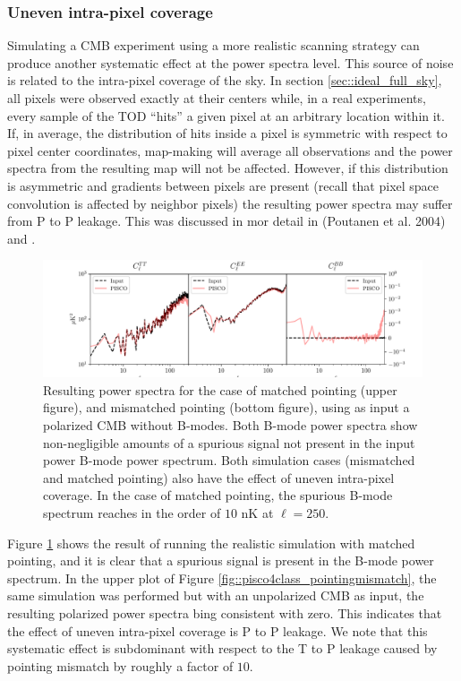\documentclass[a4paper,11pt]{article}
\begin{document}
\subsubsection{Uneven intra-pixel coverage}

Simulating a CMB experiment using a more realistic scanning strategy can produce another systematic effect at the power spectra level. This source of noise is related to the intra-pixel coverage of the sky. In section \ref{sec::ideal_full_sky}, all pixels were observed exactly at their centers while, in a real experiments, every sample of the TOD ``hits'' a given pixel at an arbitrary location within it. If, in average, the distribution of hits inside a pixel is symmetric with respect to pixel center coordinates, map-making will average all observations and the power spectra from the resulting map will not be affected. However, if this distribution is asymmetric and gradients between pixels are present (recall that pixel space convolution is affected by neighbor pixels) the resulting power spectra may suffer from P to P leakage. This was discussed in mor detail in (Poutanen et al. 2004) and \cite{2005poutanen}. 

\begin{figure}
	\centering
	\includegraphics[width=1\textwidth]{figures/cmb_r0d00_CLASS_matchedPointing_matchedBeams_ellipticalBeams.pdf}
	\caption{Resulting power spectra for the case of matched pointing (upper figure), and mismatched pointing (bottom figure), using as input a polarized CMB without B-modes. Both B-mode power spectra show non-negligible amounts of a spurious signal not present in the input power B-mode power spectrum. Both simulation cases (mismatched and matched pointing) also have the effect of uneven intra-pixel coverage. In the case of matched pointing, the spurious B-mode spectrum reaches in the order of $10$ nK at $\ell = 250$.}
	\label{fig::pisco4class_intrapixel}
\end{figure}

Figure \ref{fig::pisco4class_intrapixel} shows the result of running the realistic simulation with matched pointing, and it is clear that a spurious signal is present in the B-mode power spectrum. In the upper plot of Figure \ref{fig::pisco4class_pointingmismatch}, the same simulation was performed but with an unpolarized CMB as input, the resulting polarized power spectra bing consistent with zero. This indicates that the effect of uneven intra-pixel coverage is P to P leakage. We note that this systematic effect is subdominant with respect to the T to P leakage caused by pointing mismatch by roughly a factor of $10$.
\end{document}
